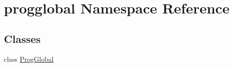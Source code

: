 \hypertarget{namespaceprogglobal}{}\section{progglobal Namespace Reference}
\label{namespaceprogglobal}
\subsection*{Classes}
\begin{DoxyCompactItemize}
\item 
class \hyperlink{classprogglobal_1_1_prog_global}{Prog\+Global}
\end{DoxyCompactItemize}
